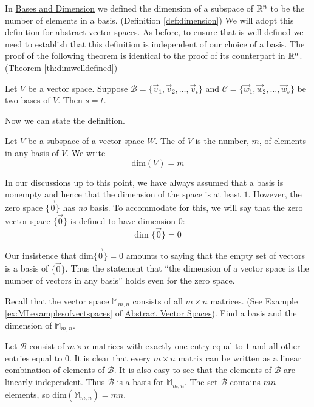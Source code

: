 \documentclass{ximera}
\begin{document}
In \href{https://ximera.osu.edu/oerlinalg/LinearAlgebra/VSP-0035/main}{Bases and Dimension} we defined the dimension of a subspace of $\mathbb{R}^n$ to be the number of elements in a basis. (Definition \ref{def:dimension})  We will adopt this definition for abstract vector spaces.  As before, to ensure that  is well-defined we need to establish that this definition is independent of our choice of a basis.  The proof of the following theorem is identical to the proof of its counterpart in $\mathbb{R}^n$.  (Theorem \ref{th:dimwelldefined})

\begin{theorem}\label{th:dimwelldefinedabstract}
Let $V$ be a vector space.  Suppose $\mathcal{B}=\{\vec{v}_1, \vec{v}_2,\ldots ,\vec{v}_t\}$ and $\mathcal{C}=\{\vec{w}_1, \vec{w}_2,\ldots ,\vec{w}_s\}$ be two bases of $V$.  Then $s=t$.
\end{theorem}
Now we can state the definition.
\begin{definition}\label{def:dimensionabstract}
Let $V$ be a subspace of a vector space $W$.  The  of $V$ is the number, $m$, of elements in any basis of $V$.  We write
$$\mbox{dim}(V)=m$$
\end{definition}

In our discussions up to this point, we have always assumed that a basis is nonempty and hence that the dimension of the space is at least $1$. However, the zero space $\{\vec{0}\}$ has {\it no} basis.  To accommodate for this, we will say that the zero vector space $\{\vec{0}\}$ is defined to have dimension $0$:
\begin{equation*}
\mbox{dim }\{\vec{0}\} = 0
\end{equation*}

Our insistence that $\mbox{dim}\{\vec{0}\} = 0$ amounts to saying that the empty set of vectors is a basis of $\{\vec{0}\}$. Thus the statement that ``the dimension of a vector space is the number of vectors in any basis'' holds even for the zero space. 

\begin{example}\label{ex:dimofM}
Recall that the vector space $\mathbb{M}_{m,n}$ consists of all $m\times n$ matrices. (See Example \ref{ex:MLexamplesofvectspaces} of \href{https://ximera.osu.edu/oerlinalg/LinearAlgebra/VSP-0050/main}{Abstract Vector Spaces}).  Find a basis and the dimension of $\mathbb{M}_{m,n}$.
\begin{explanation}
Let $\mathcal{B}$ consist of $m\times n$ matrices 
 with exactly one entry equal to $1$ and all other entries equal to $0$. It is clear that every $m\times n$ matrix can be written as a linear combination of elements of $\mathcal{B}$.  It is also easy to see that the elements of $\mathcal{B}$ are linearly independent.  Thus $\mathcal{B}$ is a basis for $\mathbb{M}_{m,n}$.  The set $\mathcal{B}$ contains $mn$ elements, so $\mbox{dim}(\mathbb{M}_{m,n})=mn$.
\end{explanation}
\end{example}
\end{document}
